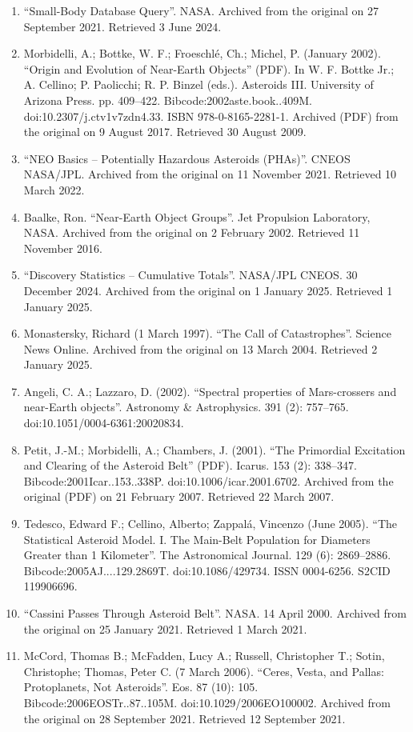 \begin{enumerate}
\item ``Small-Body Database Query''. NASA. Archived from the original on 27 September 2021. Retrieved 3 June 2024.
\item Morbidelli, A.; Bottke, W. F.; Froeschlé, Ch.; Michel, P. (January 2002). ``Origin and Evolution of Near-Earth Objects'' (PDF). In W. F. Bottke Jr.; A. Cellino; P. Paolicchi; R. P. Binzel (eds.). Asteroids III. University of Arizona Press. pp. 409–422. Bibcode:2002aste.book..409M. doi:10.2307/j.ctv1v7zdn4.33. ISBN 978-0-8165-2281-1. Archived (PDF) from the original on 9 August 2017. Retrieved 30 August 2009.
\item ``NEO Basics – Potentially Hazardous Asteroids (PHAs)''. CNEOS NASA/JPL. Archived from the original on 11 November 2021. Retrieved 10 March 2022.
\item Baalke, Ron. ``Near-Earth Object Groups''. Jet Propulsion Laboratory, NASA. Archived from the original on 2 February 2002. Retrieved 11 November 2016.
\item ``Discovery Statistics – Cumulative Totals''. NASA/JPL CNEOS. 30 December 2024. Archived from the original on 1 January 2025. Retrieved 1 January 2025.
\item Monastersky, Richard (1 March 1997). ``The Call of Catastrophes''. Science News Online. Archived from the original on 13 March 2004. Retrieved 2 January 2025.
\item Angeli, C. A.; Lazzaro, D. (2002). ``Spectral properties of Mars-crossers and near-Earth objects''. Astronomy \& Astrophysics. 391 (2): 757–765. doi:10.1051/0004-6361:20020834.
\item Petit, J.-M.; Morbidelli, A.; Chambers, J. (2001). ``The Primordial Excitation and Clearing of the Asteroid Belt'' (PDF). Icarus. 153 (2): 338–347. Bibcode:2001Icar..153..338P. doi:10.1006/icar.2001.6702. Archived from the original (PDF) on 21 February 2007. Retrieved 22 March 2007.
\item Tedesco, Edward F.; Cellino, Alberto; Zappalá, Vincenzo (June 2005). ``The Statistical Asteroid Model. I. The Main-Belt Population for Diameters Greater than 1 Kilometer''. The Astronomical Journal. 129 (6): 2869–2886. Bibcode:2005AJ....129.2869T. doi:10.1086/429734. ISSN 0004-6256. S2CID 119906696.
\item ``Cassini Passes Through Asteroid Belt''. NASA. 14 April 2000. Archived from the original on 25 January 2021. Retrieved 1 March 2021.
\item McCord, Thomas B.; McFadden, Lucy A.; Russell, Christopher T.; Sotin, Christophe; Thomas, Peter C. (7 March 2006). ``Ceres, Vesta, and Pallas: Protoplanets, Not Asteroids''. Eos. 87 (10): 105. Bibcode:2006EOSTr..87..105M. doi:10.1029/2006EO100002. Archived from the original on 28 September 2021. Retrieved 12 September 2021.

\end{enumerate}
